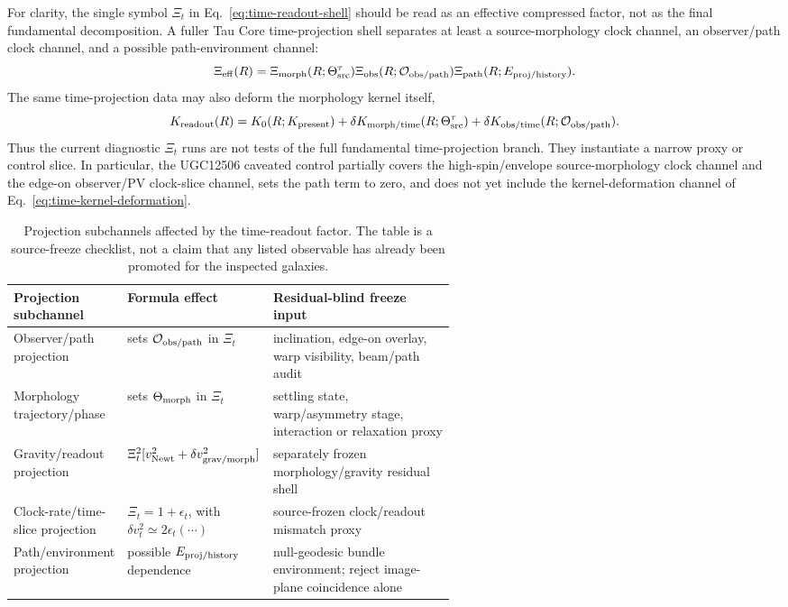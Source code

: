 \documentclass[11pt]{article}
\begin{document}
For clarity, the single symbol \(\Xi_t\) in
Eq.~\eqref{eq:time-readout-shell} should be read as an effective compressed
factor, not as the final fundamental decomposition.  A fuller Tau Core
time-projection shell separates at least a source-morphology clock channel, an
observer/path clock channel, and a possible path-environment channel:
\begin{equation}
  \Xi_{\rm eff}(R)
  =
  \Xi_{\rm morph}(R;\Theta_{\rm src}^{\tau})
  \Xi_{\rm obs}(R;{\cal O}_{\rm obs/path})
  \Xi_{\rm path}(R;E_{\rm proj/history}) .
  \label{eq:time-readout-factorization}
\end{equation}
The same time-projection data may also deform the morphology kernel itself,
\begin{equation}
  K_{\rm readout}(R)
  =
  K_0(R;K_{\rm present})
  +
  \delta K_{\rm morph/time}(R;\Theta_{\rm src}^{\tau})
  +
  \delta K_{\rm obs/time}(R;{\cal O}_{\rm obs/path}) .
  \label{eq:time-kernel-deformation}
\end{equation}
Thus the current diagnostic \(\Xi_t\) runs are not tests of the full
fundamental time-projection branch.  They instantiate a narrow proxy or
control slice.  In particular, the UGC12506 caveated control partially covers
the high-spin/envelope source-morphology clock channel and the edge-on
observer/PV clock-slice channel, sets the path term to zero, and does not yet
include the kernel-deformation channel of Eq.~\eqref{eq:time-kernel-deformation}.

\begin{table}[H]
\centering
\small
\setlength{\tabcolsep}{4pt}
\begin{tabularx}{\linewidth}{@{}p{0.25\linewidth}p{0.32\linewidth}X@{}}
\toprule
Projection subchannel & Formula effect & Residual-blind freeze input \\
\midrule
Observer/path projection &
sets \({\cal O}_{\rm obs/path}\) in \(\Xi_t\) &
inclination, edge-on overlay, warp visibility, beam/path audit \\
Morphology trajectory/phase &
sets \(\Theta_{\rm morph}\) in \(\Xi_t\) &
settling state, warp/asymmetry stage, interaction or relaxation proxy \\
Gravity/readout projection &
\(\Xi_t^2[v_{\rm Newt}^2+\delta v_{\rm grav/morph}^2]\) &
separately frozen morphology/gravity residual shell \\
Clock-rate/time-slice projection &
\(\Xi_t=1+\epsilon_t\), with
\(\delta v_t^2\simeq2\epsilon_t(\cdots)\) &
source-frozen clock/readout mismatch proxy \\
Path/environment projection &
possible \(E_{\rm proj/history}\) dependence &
null-geodesic bundle environment; reject image-plane coincidence alone \\
\bottomrule
\end{tabularx}
\caption{Projection subchannels affected by the time-readout factor.  The
table is a source-freeze checklist, not a claim that any listed observable has
already been promoted for the inspected galaxies.}
\label{tab:time-readout-projection-matrix}
\end{table}
\end{document}
